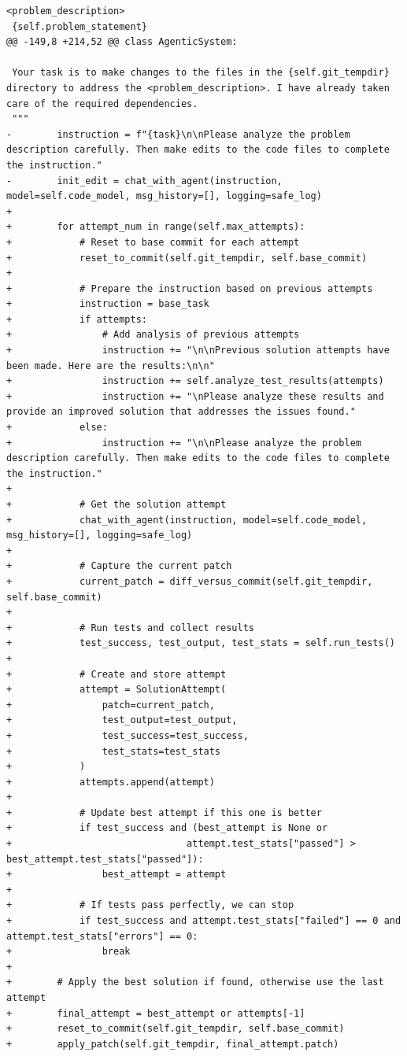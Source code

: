 \documentclass{article} %
\begin{document}
\begin{lstlisting}[style=diffstyle]
 <problem_description>
 {self.problem_statement}
@@ -149,8 +214,52 @@ class AgenticSystem:
 
 Your task is to make changes to the files in the {self.git_tempdir} directory to address the <problem_description>. I have already taken care of the required dependencies.
 """
-        instruction = f"{task}\n\nPlease analyze the problem description carefully. Then make edits to the code files to complete the instruction."
-        init_edit = chat_with_agent(instruction, model=self.code_model, msg_history=[], logging=safe_log)
+
+        for attempt_num in range(self.max_attempts):
+            # Reset to base commit for each attempt
+            reset_to_commit(self.git_tempdir, self.base_commit)
+            
+            # Prepare the instruction based on previous attempts
+            instruction = base_task
+            if attempts:
+                # Add analysis of previous attempts
+                instruction += "\n\nPrevious solution attempts have been made. Here are the results:\n\n"
+                instruction += self.analyze_test_results(attempts)
+                instruction += "\nPlease analyze these results and provide an improved solution that addresses the issues found."
+            else:
+                instruction += "\n\nPlease analyze the problem description carefully. Then make edits to the code files to complete the instruction."
+
+            # Get the solution attempt
+            chat_with_agent(instruction, model=self.code_model, msg_history=[], logging=safe_log)
+            
+            # Capture the current patch
+            current_patch = diff_versus_commit(self.git_tempdir, self.base_commit)
+            
+            # Run tests and collect results 
+            test_success, test_output, test_stats = self.run_tests()
+            
+            # Create and store attempt
+            attempt = SolutionAttempt(
+                patch=current_patch,
+                test_output=test_output,
+                test_success=test_success,
+                test_stats=test_stats
+            )
+            attempts.append(attempt)
+            
+            # Update best attempt if this one is better
+            if test_success and (best_attempt is None or 
+                               attempt.test_stats["passed"] > best_attempt.test_stats["passed"]):
+                best_attempt = attempt
+            
+            # If tests pass perfectly, we can stop
+            if test_success and attempt.test_stats["failed"] == 0 and attempt.test_stats["errors"] == 0:
+                break
+        
+        # Apply the best solution if found, otherwise use the last attempt
+        final_attempt = best_attempt or attempts[-1]
+        reset_to_commit(self.git_tempdir, self.base_commit)
+        apply_patch(self.git_tempdir, final_attempt.patch)
 

\end{lstlisting}
\end{document}
